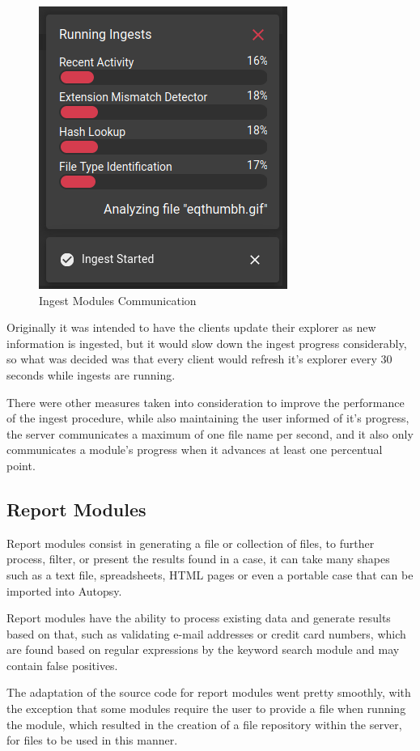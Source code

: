 \begin{figure}[ht]
 \centering
 \includegraphics[width=0.55\linewidth]{imgs/modules.png}
 \caption{Ingest Modules Communication}
 \label{fig:modules}
\end{figure}

Originally it was intended to have the clients update their explorer as new information is ingested, but it would slow down the ingest progress considerably, so what was decided was that every client would refresh 
it's explorer every 30 seconds while ingests are running.

There were other measures taken into consideration to improve the performance of the ingest procedure, while also maintaining the user informed of it's progress, the server communicates a maximum of one file name per
second, and it also only communicates a module's progress when it advances at least one percentual point.

\subsection{Report Modules}

Report modules consist in generating a file or collection of files, to further process, filter, or present the results found in a case, it can take many shapes such as a text file, spreadsheets, HTML pages or even a portable case that can be imported into Autopsy.

Report modules have the ability to process existing data and generate results based on that, such as validating e-mail addresses or credit card numbers, 
which are found based on regular expressions by the keyword search module and may contain false positives.

The adaptation of the source code for report modules went pretty smoothly, with the exception that some modules require the user to provide a file when running the module, which resulted in the creation of a file repository within the server, for files to be used in this manner.

